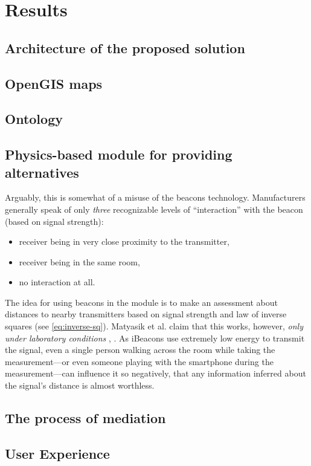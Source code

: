 \chapter{Results}
\label{cha:results}

\section{Architecture of the proposed solution}
\label{sec:architecture}

\section{OpenGIS maps}

\section{Ontology}

\section{Physics-based module for providing alternatives}
\label{sec:physics-module}



 Arguably, this is somewhat of a misuse of the beacons technology. Manufacturers generally speak of only \emph{three} recognizable levels of ``interaction'' with the beacon (based on signal strength): \begin{itemize}
 	\item receiver being in very close proximity to the transmitter,
 	\item receiver being in the same room,
 	\item no interaction at all.
 \end{itemize}
 
The idea for using beacons in the module is to make an assessment about distances to nearby transmitters based on signal strength and law of inverse squares (see \cref{eq:inverse-sq}). Matyasik et al. claim that this works, however, \emph{only under laboratory conditions} \cite{Matyasik:iBeacon}, \cite{Matyasik:iBeacon:slides}. As iBeacons use extremely low energy to transmit the signal, even a single person walking across the room while taking the measurement---or even someone playing with the smartphone during the measurement---can influence it so negatively, that any information inferred about the signal's distance is almost worthless.

\section{The process of mediation}


\section{User Experience}
\label{sec:user-experience}
